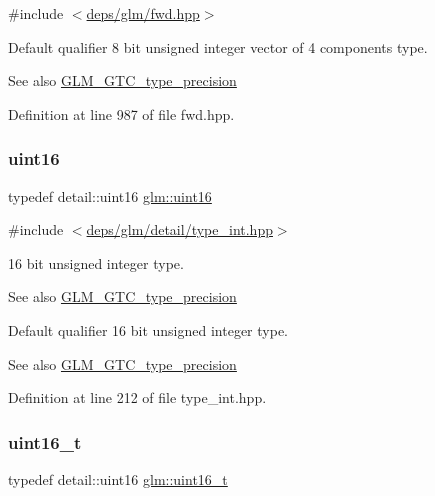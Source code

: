 {\ttfamily \#include $<$\hyperlink{fwd_8hpp}{deps/glm/fwd.\+hpp}$>$}

Default qualifier 8 bit unsigned integer vector of 4 components type. \begin{DoxySeeAlso}{See also}
\hyperlink{group__gtc__type__precision}{G\+L\+M\+\_\+\+G\+T\+C\+\_\+type\+\_\+precision} 
\end{DoxySeeAlso}


Definition at line 987 of file fwd.\+hpp.

\mbox{\label{group__gtc__type__precision_gad8c2939e1fdd8e5828b31d95c52255d5}} 
\subsubsection{\texorpdfstring{uint16}{uint16}}
{\footnotesize\ttfamily typedef detail\+::uint16 \hyperlink{group__gtc__type__precision_gad8c2939e1fdd8e5828b31d95c52255d5}{glm\+::uint16}}



{\ttfamily \#include $<$\hyperlink{type__int_8hpp}{deps/glm/detail/type\+\_\+int.\+hpp}$>$}

16 bit unsigned integer type. \begin{DoxySeeAlso}{See also}
\hyperlink{group__gtc__type__precision}{G\+L\+M\+\_\+\+G\+T\+C\+\_\+type\+\_\+precision}
\end{DoxySeeAlso}
Default qualifier 16 bit unsigned integer type. \begin{DoxySeeAlso}{See also}
\hyperlink{group__gtc__type__precision}{G\+L\+M\+\_\+\+G\+T\+C\+\_\+type\+\_\+precision} 
\end{DoxySeeAlso}


Definition at line 212 of file type\+\_\+int.\+hpp.

\mbox{\label{group__gtc__type__precision_gac4eb4f43cae8129b00086dc234d3b8fc}} 
\subsubsection{\texorpdfstring{uint16\+\_\+t}{uint16\_t}}
{\footnotesize\ttfamily typedef detail\+::uint16 \hyperlink{group__gtc__type__precision_gac4eb4f43cae8129b00086dc234d3b8fc}{glm\+::uint16\+\_\+t}}




